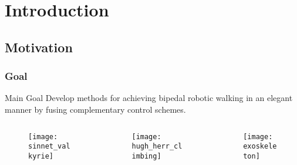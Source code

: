 \section{Introduction}
\showtoc

\subsection{Motivation}

\begin{frame}[t]
  \frametitle{Goal}
  \begin{block}{Main Goal}
    Develop methods for achieving bipedal robotic walking in an elegant manner by fusing complementary control schemes.
  \end{block}
    \begin{columns}
    \begin{column}{.333\textwidth}
      \begin{figure}
        \centering
        \texttt{[image: sinnet\_valkyrie]}
      \end{figure}
    \end{column}
    \begin{column}{.333\textwidth}
      \begin{figure}
        \centering
        \texttt{[image: hugh\_herr\_climbing]}
      \end{figure}
    \end{column}
    \begin{column}{.333\textwidth}
      \begin{figure}
        \centering
        \texttt{[image: exoskeleton]}
      \end{figure}
    \end{column}
  \end{columns}
\end{frame}


